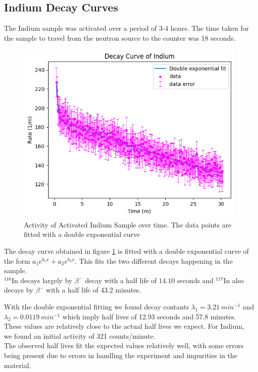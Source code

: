 \documentclass[12pt,a4paper]{article}
\begin{document}
  \subsection{Indium Decay Curves}
    The Indium sample was activated over a period of 3-4 hours. The time taken for the sample to travel from the neutron source to the counter was 18 seconds.
    \begin{figure}[H]
      \centering
      \includegraphics{./Pictures/Indium.png}
      \caption{Activity of Activated Indium Sample over time. The data points are fitted with a double exponential curve}
      \label{fig:ind}
    \end{figure}

    The decay curve obtained in figure \ref{fig:ind} is fitted with a double exponential curve of the form $a_1e^{b_1x}+a_2e^{b_2x}$. This fits the two different decays happening in the sample. \\
    $^{116}$In decays largely by $\beta^-$ decay with a half life of $14.10$ seconds\cite{Jaeck116} and $^{117}$In also decays by $\beta^-$ with a half life of 43.2 minutes\cite{Jaeck117}.
    
    With the double exponential fitting we found decay contants $\lambda_1 =3.21 ~min^{-1}$  and $\lambda_2=0.0119 ~min^{-1}$ which imply half lives of 12.93 seconds and 57.8 minutes. These values are relatively close 
    to the actual half lives we expect. For Indium, we found an initial activity of 321 counts/minute.\\

    The observed half lives fit the expected values relatively well, with some errors being present due to errors in handling the experiment and impurities in the material.
\end{document}
